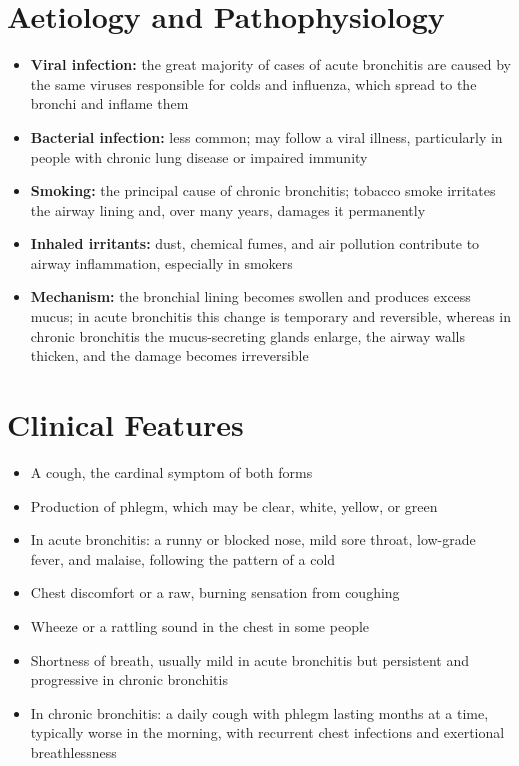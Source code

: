 \section*{Aetiology and Pathophysiology}
\begin{itemize}
    \item \textbf{Viral infection:} the great majority of cases of acute bronchitis are caused by the same viruses responsible for colds and influenza, which spread to the bronchi and inflame them
    \item \textbf{Bacterial infection:} less common; may follow a viral illness, particularly in people with chronic lung disease or impaired immunity
    \item \textbf{Smoking:} the principal cause of chronic bronchitis; tobacco smoke irritates the airway lining and, over many years, damages it permanently
    \item \textbf{Inhaled irritants:} dust, chemical fumes, and air pollution contribute to airway inflammation, especially in smokers
    \item \textbf{Mechanism:} the bronchial lining becomes swollen and produces excess mucus; in acute bronchitis this change is temporary and reversible, whereas in chronic bronchitis the mucus-secreting glands enlarge, the airway walls thicken, and the damage becomes irreversible
\end{itemize}

\section*{Clinical Features}
\begin{itemize}
    \item A cough, the cardinal symptom of both forms
    \item Production of phlegm, which may be clear, white, yellow, or green
    \item In acute bronchitis: a runny or blocked nose, mild sore throat, low-grade fever, and malaise, following the pattern of a cold
    \item Chest discomfort or a raw, burning sensation from coughing
    \item Wheeze or a rattling sound in the chest in some people
    \item Shortness of breath, usually mild in acute bronchitis but persistent and progressive in chronic bronchitis
    \item In chronic bronchitis: a daily cough with phlegm lasting months at a time, typically worse in the morning, with recurrent chest infections and exertional breathlessness
\end{itemize}

